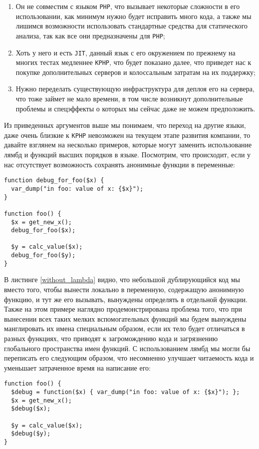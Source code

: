 \begin{enumerate}
\item Он не совместим с языком \verb|PHP|, что вызывает некоторые сложности в его использовании, как минимум нужно будет исправить много кода, а также мы лишимся возможности использовать стандартные средства для статического анализа, так как все они предназначены для \verb|PHP|;

\item Хоть у него и есть \verb|JIT|, данный язык с его окружением по прежнему на многих тестах медленнее \verb|KPHP|, что будет показано далее, что приведет нас к покупке дополнительных серверов и колоссальным затратам на их поддержку;

\item Нужно переделать существующую инфраструктура для деплоя его на сервера, что тоже займет не мало времени, в том числе возникнут дополнительные проблемы и спецэффекты о которых мы сейчас даже не можем предположить.
\end{enumerate}

Из приведенных аргументов выше мы понимаем, что переход на другие языки, даже очень близкие к \verb|KPHP| невозможен на текущем этапе развития компании, то давайте взглянем на несколько примеров, которые могут заменить использование лямбд и функций высших порядков в языке.
Посмотрим, что происходит, если у нас отсутствует возможность сохранять анонимные функции в переменные:
\begin{lstlisting}[caption={Пример кода без анонимных функций},label={without_lambda}]
function debug_for_foo($x) {
  var_dump("in foo: value of x: {$x}");
}

function foo() {
  $x = get_new_x();
  debug_for_foo($x);

  $y = calc_value($x);
  debug_for_foo($y);
}
\end{lstlisting}

В листинге \ref{without_lambda} видно, что небольшой дублирующийся код мы вместо того, чтобы вынести локально в переменную, содержащую анонимную функцию, и тут же его вызывать, вынуждены определять в отдельной функции.
Также на этом примере наглядно продемонстрирована проблема того, что при вынесении всех таких мелких вспомогательных функций мы будем вынуждены манглировать их имена специальным образом, если их тело будет отличаться в разных функциях, что приводят к загромождению кода и загрязнению глобального пространства имен функций.
С использованием лямбд мы могли бы переписать его следующим образом, что несомненно улучшает читаемость кода и уменьшает затраченное время на написание его:
\begin{lstlisting}
function foo() {
  $debug = function($x) { var_dump("in foo: value of x: {$x}"); };
  $x = get_new_x();
  $debug($x);

  $y = calc_value($x);
  $debug($y);
}
\end{lstlisting}

